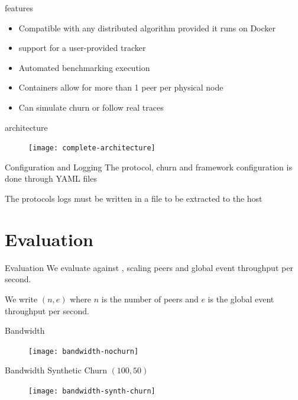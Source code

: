 \begin{frame}{\sys{} features}
    \begin{itemize}
    	\item Compatible with any distributed algorithm provided it runs on Docker
    	\item support for a user-provided tracker
    	\item Automated benchmarking execution
    	\item Containers allow for more than 1 peer per physical node
    	\item Can simulate churn or follow real traces
    \end{itemize}
\end{frame}

\begin{frame}{\sys{} architecture}
	\begin{figure}
		\texttt{[image: complete-architecture]}
	\end{figure}
\end{frame}

\begin{frame}{\sys{} Configuration and Logging}
	The protocol, churn and framework configuration is done through \textsc{YAML} files
	
	The protocols logs must be written in a file to be extracted to the host
\end{frame}

\section{Evaluation}
\subtitle[Evaluation]{Evaluation}

\begin{frame}{Evaluation}
    We evaluate \epto{} against \jgroups{}, scaling peers and global event throughput per second.
    
    We write $(n,e)$ where $n$ is the number of peers and $e$ is the global event throughput per second.
\end{frame}

\begin{frame}{Bandwidth}
	\begin{figure}
		\texttt{[image: bandwidth-nochurn]}
	\end{figure}
\end{frame}

\begin{frame}{Bandwidth Synthetic Churn $(100,50)$}
	\begin{figure}
		\texttt{[image: bandwidth-synth-churn]}
	\end{figure}
\end{frame}

